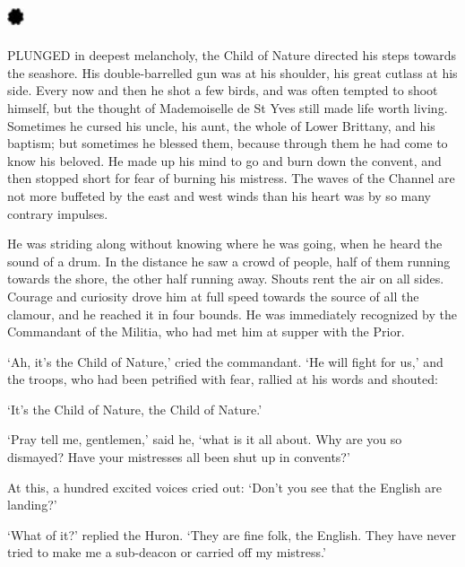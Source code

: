 \documentclass{article}
\begin{document}
\begin{center}
\section*{%
\includegraphics[width=14pt, height=15pt, keepaspectratio=true]{Zadig or L'Ingenu - Voltaire-fig029.jpg}
}

 

PLUNGED in deepest melancholy, the Child of Nature directed his steps towards the 
seashore. His double-barrelled gun was at his shoulder, his great cutlass at his 
side. Every now and then he shot a few birds, and was often tempted to shoot himself, 
but the thought of Mademoiselle de St Yves still made life worth living. Sometimes 
he cursed his uncle, his aunt, the whole of Lower Brittany, and his baptism; but 
sometimes he blessed them, because through them he had come to know his beloved. 
He made up his mind to go and burn down the convent, and then stopped short for 
fear of burning his mistress. The waves of the Channel are not more buffeted by 
the east and west winds than his heart was by so many contrary impulses. 

He was striding along without knowing where he was going, when he heard the sound 
of a drum. In the distance he saw a crowd of people, half of them running towards 
the shore, the other half running away. Shouts rent the air on all sides. Courage 
and curiosity drove him at full speed towards the source of all the clamour, and 
he reached it in four bounds. He was immediately recognized by the Commandant of 
the Militia, who had met him at supper with the Prior. 

`Ah, it's the Child of Nature,' cried the commandant. `He will fight for us,' and 
the troops, who had been petrified with fear, rallied at his words and shouted: 

`It's the Child of Nature, the Child of Nature.' 

`Pray tell me, gentlemen,' said he, `what is it all about. Why are you so dismayed? 
Have your mistresses all been shut up in convents?' 

At this, a hundred excited voices cried out: `Don't you see that the English are 
landing?' 

`What of it?' replied the Huron. `They are fine folk, the English. They have never 
tried to make me a sub-deacon or carried off my mistress.' 


\end{center}
\end{document}
